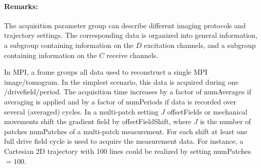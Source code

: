 \documentclass[landscape,a4paper]{article} %
\newcommand{\inlvar}[1]{{\ttfamily#1}}
\begin{document}
\begin{multicols}{2}
\paragraph{Remarks:} The acquisition parameter group can describe different imaging protocols and trajectory settings. The corresponding data is organized into general information, a subgroup containing information on the $D$ excitation channels, and a subgroup containing information on the $C$ receive channels.

In MPI, a frame groups all data used to reconstruct a single MPI image/tomogram. In the simplest scenario, this data is acquired during one \inlvar{/drivefield/period}. The acquisition time increases by a factor of \inlvar{numAverages} if averaging is applied and by a factor of \inlvar{numPeriods} if data is recorded over several (averaged) cycles. In a multi-patch setting $J$ \inlvar{offsetField}s or mechanical movements shift the gradient field by \inlvar{offsetFieldShift}, where $J$ is the number of patches \inlvar{numPatches} of a multi-patch measurement. For each shift at least one full drive field cycle is used to acquire the measurement data. For instance, a Cartesian 2D trajectory with 100 lines could be realized by setting \mbox{\inlvar{numPatches} $ = 100$}.

\end{multicols}
\end{document}
